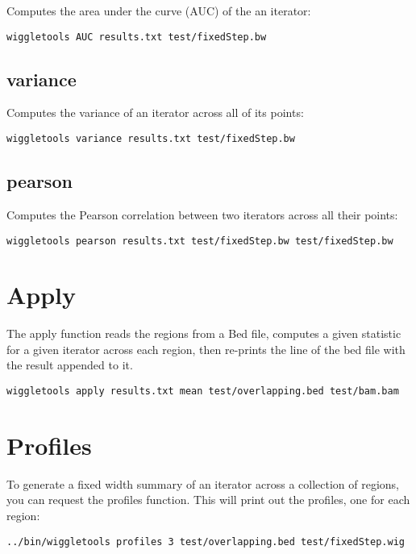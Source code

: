 \documentclass[12pt]{article}
\begin{document}
Computes the area under the curve (AUC) of the an iterator:

\begin{verbatim}
wiggletools AUC results.txt test/fixedStep.bw
\end{verbatim}

\subsection{variance}

Computes the variance of an iterator across all of its points:

\begin{verbatim}
wiggletools variance results.txt test/fixedStep.bw 
\end{verbatim}

\subsection{pearson}

Computes the Pearson correlation between two iterators across all their points:

\begin{verbatim}
wiggletools pearson results.txt test/fixedStep.bw test/fixedStep.bw 
\end{verbatim}

\section{Apply}

The apply function reads the regions from a Bed file, computes a given statistic for a given iterator across each region, then re-prints the line of the bed file with the result appended to it.

\begin{verbatim}
wiggletools apply results.txt mean test/overlapping.bed test/bam.bam 
\end{verbatim}

\section{Profiles}

To generate a fixed width summary of an iterator across a collection of regions, you can request the profiles function. This will print out the profiles, one for each region:

\begin{verbatim}
../bin/wiggletools profiles 3 test/overlapping.bed test/fixedStep.wig
\end{verbatim}
\end{document}
